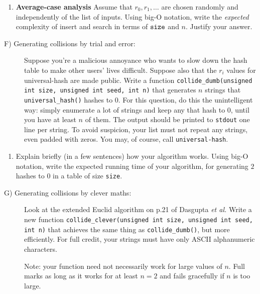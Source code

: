 \documentclass[11pt]{article}
\newcommand{\size}{{\tt size}}
\begin{document}
\begin{enumerate}[resume]
    \item {\bf Average-case analysis}
        Assume that $r_0, r_1, \ldots$ are chosen randomly and independently of the list of inputs.
        Using big-O notation,
        write the \emph{expected} complexity of insert and search in terms of $\size$ and $n$.
        Justify your answer.
\end{enumerate}

\begin{description}
    \item[F) Generating collisions by trial and error: ]
        Suppose you're a malicious annoyance who wants to slow down the hash table to make other users' lives difficult.
        Suppose also that the $r_i$ values for universal-hash are made public.
        Write a function
        {\tt collide\_dumb(unsigned int size, unsigned int seed, int n)}
        that generates $n$ strings that {\tt universal\_hash()} hashes to 0.
        For this question, do this the unintelligent way:
        simply enumerate a lot of strings and keep any that hash to 0,
        until you have at least $n$ of them.
        The output should be printed to {\tt stdout} one line per string.
        To avoid suspicion, your list must not repeat any strings, even padded with zeros.
        You may, of course, call {\tt universal-hash}.

\end{description}

\begin{enumerate}[resume]
\item Explain briefly (in a few sentences) how your algorithm works.  Using big-O notation,
    write the expected running time of your algorithm,
    for generating $2$ hashes to 0 in a table of size {\tt size}.
\end{enumerate}

\begin{description}
\item[G) Generating collisions by clever maths: ]
    Look at the extended Euclid algorithm on p.21 of Dasgupta {\it et al.}
        Write a new function
        {\tt collide\_clever(unsigned int size, unsigned int seed, int n)}
        that achieves the same thing as {\tt collide\_dumb()},
        but more efficiently.
        For full credit,
        your strings must have only ASCII alphanumeric characters.

       Note: your function need not necessarily work for large values of $n$.  Full marks as long as it works for
       at least $n=2$ and fails gracefully if $n$ is too large.
\end{description}
\end{document}
